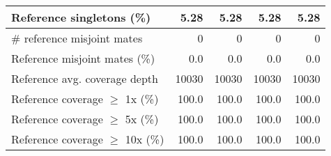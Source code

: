 \documentclass[12pt,a4paper]{article}
\begin{document}
\begin{table}[ht]
\begin{center}
\begin{tabular}{|l*{4}{|r}|}
Reference singletons (\%) & 5.28 & 5.28 & 5.28 & 5.28 \\ \hline
\# reference misjoint mates & 0 & 0 & 0 & 0 \\ \hline
Reference misjoint mates (\%) & 0.0 & 0.0 & 0.0 & 0.0 \\ \hline
Reference avg. coverage depth & 10030 & 10030 & 10030 & 10030 \\ \hline
Reference coverage $\geq$ 1x (\%) & 100.0 & 100.0 & 100.0 & 100.0 \\ \hline
Reference coverage $\geq$ 5x (\%) & 100.0 & 100.0 & 100.0 & 100.0 \\ \hline
Reference coverage $\geq$ 10x (\%) & 100.0 & 100.0 & 100.0 & 100.0 \\ \hline
\end{tabular}
\end{center}
\end{table}
\end{document}
